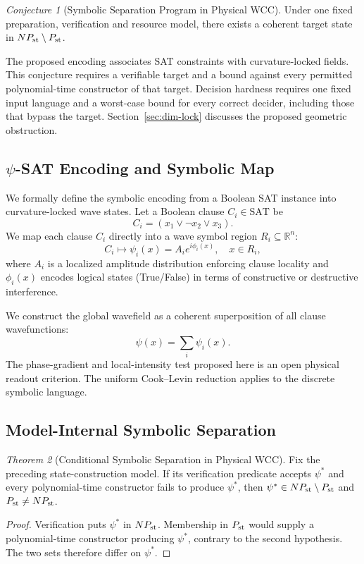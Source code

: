 \documentclass[12pt]{article}
\theoremstyle{remark}
\newtheorem{theorem}{Theorem}[section]
\newtheorem{conjecture}[theorem]{Conjecture}
\begin{document}
\label{sec:model-separation}

\begin{conjecture}[Symbolic Separation Program in Physical WCC]
Under one fixed preparation, verification and resource model, there exists
a coherent target state in $NP_{\rm st}\setminus P_{\rm st}$.
\end{conjecture}
The proposed encoding associates SAT constraints with curvature-locked
fields. This conjecture requires a verifiable target and a bound against
every permitted polynomial-time constructor of that target.
Decision hardness requires one fixed input language and a worst-case bound
for every correct decider, including those that bypass the target.
Section~\ref{sec:dim-lock} discusses the proposed geometric obstruction.

\subsection{$\psi$-SAT Encoding and Symbolic Map}

We formally define the symbolic encoding from a Boolean SAT instance into
curvature-locked wave states. Let a Boolean clause
\(C_i \in \mathrm{SAT}\) be
\[
C_i = (x_1 \lor \lnot x_2 \lor x_3).
\]
We map each clause \(C_i\) directly into a wave symbol region
\( R_i \subseteq \mathbb{R}^n \):
\[
C_i \mapsto \psi_i(x) = A_i e^{i\phi_i(x)}, \quad x \in R_i,
\]
where \(A_i\) is a localized amplitude distribution enforcing clause
locality and \(\phi_i(x)\) encodes logical states (True/False) in terms of
constructive or destructive interference.

We construct the global wavefield as a coherent superposition of all clause
wavefunctions:
\[
\psi(x) = \sum_{i}\psi_i(x).
\]
The phase-gradient and local-intensity test proposed here is an open
physical readout criterion. The uniform Cook--Levin reduction applies
to the discrete symbolic language.

\subsection{Model-Internal Symbolic Separation}

\begin{theorem}[Conditional Symbolic Separation in Physical WCC]
Fix the preceding state-construction model. If its verification predicate
accepts $\psi^*$ and every polynomial-time constructor fails to produce
$\psi^*$, then $\psi^*\in NP_{\rm st}\setminus P_{\rm st}$ and
$P_{\rm st}\ne NP_{\rm st}$.
\end{theorem}
\begin{proof}
Verification puts $\psi^*$ in $NP_{\rm st}$. Membership in $P_{\rm st}$
would supply a polynomial-time constructor producing $\psi^*$, contrary to
the second hypothesis. The two sets therefore differ on $\psi^*$.
\end{proof}
\end{document}
